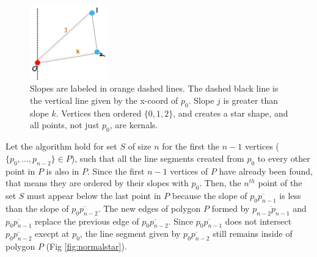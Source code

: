 \documentclass [12pt]{article}
\begin{document}
\begin{enumerate}[label=(\alph*)]
        \begin{figure}[h] 
            \centering
            \includegraphics[width=0.3\textwidth]{images/star4.PNG}
            \caption{Slopes are labeled in orange dashed lines. The dashed black line is the vertical line given by the x-coord of $p_0$. Slope $j$ is greater than slope $k$. Vertices then ordered $\{0, 1, 2\}$, and creates a star shape, and all points, not just $p_0$, are kernals.}
            \label{fig:star4}
        \end{figure} 

        

        Let the algorithm hold for set $S$ of size $n$ for the first the $n - 1$ vertices ($\{p_0, ..., p_{n - 2}\} \in P$), such that all the line segments created from $p_0$ to every other point in $P$ is also in $P$. Since the first $n - 1$ vertices of $P$ have already been found, that means they are ordered by their slopes with $p_0$. Then, the $n^{th}$ point of the set $S$ must appear below the last point in $P$ because the slope of $\overline{p_0 p_{n-1}}$ is less than the slope of $\overline{p_0 p_{n - 2}}$. The new edges of polygon $P$ formed by $\overline{p_{n-2} p_{n - 1}}$ and $\overline{p_0 p_{n - 1}}$ replace the previous edge of $\overline{p_0 p_{n - 2}}$. Since $\overline{p_0 p_{n - 1}}$ does not intersect $\overline{p_0 p_{n - 2}}$ execpt at $p_0$, the line segment given by $\overline{p_0 p_{n - 2}}$ still remains inside of polygon $P$ (Fig \ref{fig:normalstar}).


\end{enumerate}
\end{document}
